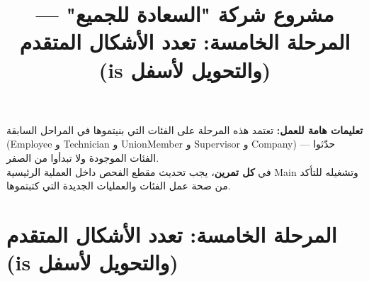 \documentclass[14pt]{extarticle}
\title{مشروع شركة "السعادة للجميع" — المرحلة الخامسة: تعدد الأشكال المتقدم (\textenglish{is} والتحويل لأسفل)}
\begin{document}
\maketitle
\thispagestyle{fancy}

\begin{boxWarning}
\textbf{تعليمات هامة للعمل:}
تعتمد هذه المرحلة على الفئات التي بنيتموها في المراحل السابقة (\textenglish{Employee} و \textenglish{Technician} و \textenglish{UnionMember} و \textenglish{Supervisor} و \textenglish{Company}) — حدّثوا الفئات الموجودة ولا تبدأوا من الصفر. \\
في \textbf{كل تمرين}، يجب تحديث مقطع الفحص داخل العملية الرئيسية \textenglish{Main} وتشغيله للتأكد من صحة عمل الفئات والعمليات الجديدة التي كتبتموها.
\end{boxWarning}

\section*{المرحلة الخامسة: تعدد الأشكال المتقدم (\textenglish{is} والتحويل لأسفل)}
\end{document}
